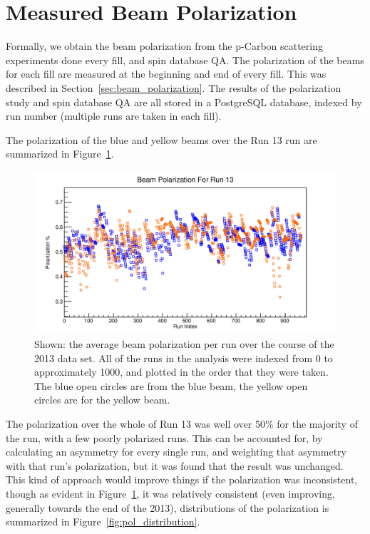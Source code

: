 \section{Measured Beam Polarization}

Formally, we obtain the beam polarization from the p-Carbon scattering
experiments done every fill, and spin database QA. The polarization of the beams
for each fill are measured at the beginning and end of every fill. This was
described in Section~\ref{sec:beam_polarization}. The results of the
polarization study and spin database QA are all stored in a PostgreSQL database,
indexed by run number (multiple runs are taken in each fill).

The polarization of the blue and yellow beams over the Run 13 run are summarized
in Figure~\ref{fig:avg_polarization}.

\begin{figure}[ht]
  \centering
  \includegraphics[width=\linewidth]{./figures/beam_polarization.jpg}
  \caption{
    Shown: the average beam polarization per run over the course of the 2013
    data set. All of the runs in the analysis were indexed from 0 to
    approximately 1000, and plotted in the order that they were taken. The blue
    open circles are from the blue beam, the yellow open circles are for the
    yellow beam.
  }
  \label{fig:avg_polarization}
\end{figure}

The polarization over the whole of Run 13 was well over 50\% for the majority of
the run, with a few poorly polarized runs. This can be accounted for, by
calculating an asymmetry for every single run, and weighting that asymmetry with
that run's polarization, but it was found that the result was unchanged. This
kind of approach would improve things if the polarization was inconsistent,
though as evident in Figure~\ref{fig:avg_polarization}, it was relatively
consistent (even improving, generally towards the end of the 2013),
distributions of the polarization is summarized in
Figure~\ref{fig:pol_distribution}.

